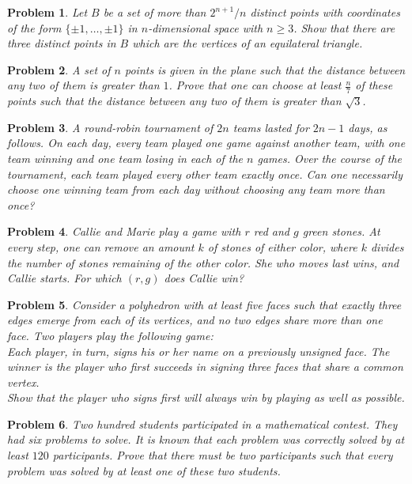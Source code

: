 \documentclass[12pt]{article}
\newtheorem{problem}{Problem}
\begin{document}
\begin{problem}
\textbf{\textcolor{red}{\heart}}
Let $B$ be a set of more than $2^{n+1}/n$ distinct points with coordinates of the form $\{\pm 1, \ldots, \pm 1\}$ in $n$-dimensional space with $n \geq 3$. Show that there are three distinct points in $B$ which are the vertices of an equilateral triangle.
\end{problem}

\begin{problem}
A set of $n$ points is given in the plane such that the distance between any two of them is greater than $1$. Prove that one can choose at least $\frac{n}{7}$ of these points such that the distance between any two of them is greater than $\sqrt{3}$.
\end{problem}

\begin{problem}
A round-robin tournament of $2n$ teams lasted for $2n-1$ days, as follows. On each day, every team played one game against another team, with one team winning and one team losing in each of the $n$ games. Over the course of the tournament, each team played every other team exactly once. Can one necessarily choose one winning team from each day without choosing any team more than once?
\end{problem}

\begin{problem}
Callie and Marie play a game with $r$ red and $g$ green stones. At every step, one can remove an amount $k$ of stones of either color, where $k$ divides the number of stones remaining of the other color. She who moves last wins, and Callie starts. For which $(r, g)$ does Callie win?
\end{problem}

\begin{problem}
Consider a polyhedron with at least five faces such that exactly three edges emerge from each of its vertices, and no two edges share more than one face. Two players play the following game:\\
Each player, in turn, signs his or her name on a previously unsigned face. The winner is the player who first succeeds in signing three faces that share a common vertex.\\
Show that the player who signs first will always win by playing as well as possible.
\end{problem}

\begin{problem}
Two hundred students participated in a mathematical contest. They had six problems to solve. It is known that each problem was correctly solved by at least $120$ participants. Prove that there must be two participants such that every problem was solved by at least one of these two students.
\end{problem}
\end{document}
